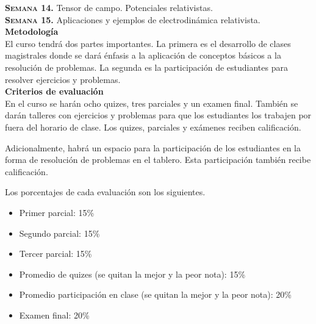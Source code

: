 \documentclass[letterpaper,10pt,onecolumn]{article}
\begin{document}
\noindent\textbf{\textsc{Semana 14.}} Tensor de campo. Potenciales
relativistas. \\[-0.3cm] 

\noindent\textbf{\textsc{Semana 15.}} Aplicaciones y ejemplos de
electrodin\'amica relativista.\\[-0.1cm]  


\noindent\textbf{\large {} \quad
  Metodolog\'ia}\\[-0.2cm] 


\noindent\normalsize El curso tendr\'a dos partes importantes. La
primera es el desarrollo de clases magistrales donde se dar\'a
\'enfasis a la aplicaci\'on de conceptos b\'asicos a la resoluci\'on
de problemas. La segunda es la participaci\'on de estudiantes para
resolver ejercicios y problemas. \\[0.1cm]

\noindent\textbf{\large {} \quad Criterios de
  evaluaci\'on}\\[-0.2cm] 

En el curso se har\'an ocho quizes, tres parciales y un examen
final. Tambi\'en se dar\'an talleres con ejercicios y problemas para
que los estudiantes los trabajen por fuera del horario de
clase. Los quizes, parciales y ex\'amenes reciben
calificaci\'on. 

Adicionalmente, habr\'a un espacio para la participaci\'on de
los estudiantes en la forma de resoluci\'on de problemas en el
tablero. Esta participaci\'on tambi\'en recibe calificaci\'on.

Los porcentajes de cada evaluaci\'on son los siguientes.
\begin{itemize}
\item Primer parcial: 15\%
\item Segundo parcial: 15\%
\item Tercer parcial: 15\%
\item Promedio de quizes (se quitan la mejor y la peor nota): 15\%
\item Promedio participaci\'on en clase (se quitan la mejor y la peor
  nota): 20\% 
\item Examen final: 20\%
\end{itemize}



\end{document}
